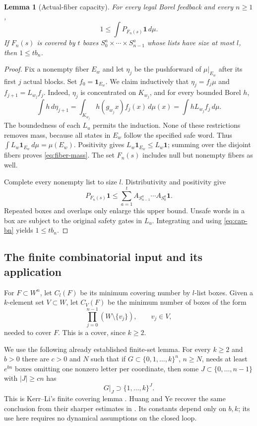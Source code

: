 \documentclass[11pt,reqno]{amsart}
\numberwithin{equation}{section}
\newtheorem{lemma}[theorem]{Lemma}
\theoremstyle{definition}
\newcommand{\one}{\mathbf 1}
\begin{document}
\begin{lemma}[Actual-fiber capacity]\label{lem:fiber-cap}
For every legal Borel feedback and every $n\ge1$,
\begin{equation}\label{eq:fiber-mass}
 1\le\int P_{F_n(s)}\one\,d\mu.
\end{equation}
If $F_n(s)$ is covered by $t$ boxes
$S^a_0\times\cdots\times S^a_{n-1}$ whose lists have size at
most $l$, then $1\le t b_n$.
\end{lemma}
\begin{proof}
Fix a nonempty fiber $E_w$ and let $\eta_j$ be the pushforward
of $\mu|_{E_w}$ after its first $j$ actual blocks. Set
$f_0=\one_{E_w}$. We claim inductively that
$\eta_j=f_j\mu$ and $f_{j+1}=L_{w_j}f_j$. Indeed,
$\eta_j$ is concentrated on $K_{w_j}$, and for every bounded Borel $h$,
\[
 \int h\,d\eta_{j+1}
 =\int_{K_{w_j}}h(g_{w_j}x)f_j(x)\,d\mu(x)
 =\int hL_{w_j}f_j\,d\mu.
\]
The boundedness of each $L_u$ permits the induction. None of these
restrictions removes mass, because all states in $E_w$ follow the
specified safe word. Thus $\int L_w\one_{E_w}\,d\mu=\mu(E_w)$.
Positivity gives $L_w\one_{E_w}\le L_w\one$; summing over the
disjoint fibers proves \eqref{eq:fiber-mass}. The set $F_n(s)$ includes
null but nonempty fibers as well.

Complete every nonempty list to size $l$. Distributivity and positivity
give
\[
 P_{F_n(s)}\one\le\sum_{a=1}^t
 A_{S^a_{n-1}}\cdots A_{S^a_0}\one.
\]
Repeated boxes and overlaps only enlarge this upper bound. Unsafe
words in a box are subject to the original safety gates in $L_u$.
Integrating and using \eqref{eq:cap-bn} yields $1\le tb_n$.
\end{proof}

\subsection{The finite combinatorial input and its application}
For $F\subset W^n$, let $C_l(F)$ be its minimum covering number by
$l$-list boxes. Given a $k$-element set $V\subset W$, let $C_V(F)$
be the minimum number of boxes of the form
\[
 \prod_{j=0}^{n-1}(W\setminus\{v_j\}),\qquad v_j\in V,
\]
needed to cover $F$. This is a cover, since $k\ge2$.

We use the following already established finite-set lemma. For every
$k\ge2$ and $b>0$ there are $c>0$ and $N$ such that if
$G\subset\{0,1,\ldots,k\}^n$, $n\ge N$, needs at least
$e^{bn}$ boxes omitting one nonzero letter per coordinate, then some
$J\subset\{0,\ldots,n-1\}$ with $|J|\ge cn$ has
\begin{equation}\label{eq:HY-cube}
 G|_J\supset\{1,\ldots,k\}^{J}.
\end{equation}
This is Kerr--Li's finite covering lemma
\cite[Lemma~3.3]{KL2007}. Huang and Ye recover the same conclusion
from their sharper estimates in \cite[Lemma~4.1 and Remark~4.2,
pp.~1701--1705]{HuangYe2009}. Its constants depend only on $b,k$;
its use here requires no dynamical assumptions on the closed loop.
\end{document}
